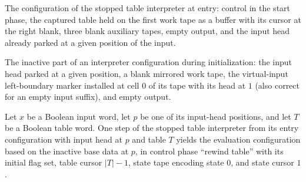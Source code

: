 \begin{definition}
\label{Turing.timedCut_InterpreterInitial}
\leanok
{}
The configuration of the stopped table interpreter at entry: control in the
start phase, the captured table held on the first work tape as a buffer with
its cursor at the right blank, three blank auxiliary tapes, empty output, and
the input head already parked at a given position of the input.
\end{definition}

\begin{definition}
\label{Turing.timedCut_InterpreterBase}
\leanok
{}
The inactive part of an interpreter configuration during initialization: the
input head parked at a given position, a blank mirrored work tape, the
virtual-input left-boundary marker installed at cell $0$ of its tape with its
head at $1$ (also correct for an empty input suffix), and empty output.
\end{definition}

\begin{lemma}
\label{Turing.timedCut_Interpreter_first}
\leanok
{}
Let $x$ be a Boolean input word, let $p$ be one of its input-head positions, and let $T$
be a Boolean table word. One step of the stopped table interpreter from its entry
configuration with input head at $p$ and table $T$ yields the evaluation configuration
based on the inactive base data at $p$, in control phase “rewind table” with its initial
flag set, table cursor $|T|-1$, state tape encoding state $0$, and state cursor $1$.
\end{lemma}

